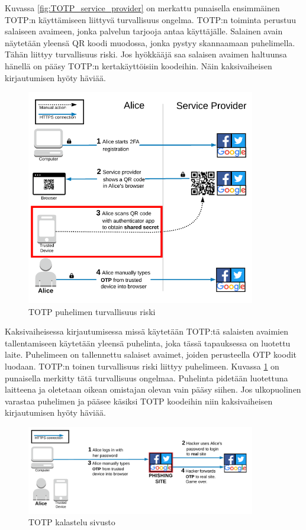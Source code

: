 Kuvassa \ref{fig:TOTP_service_provider} on merkattu punaisella ensimmäinen TOTP:n käyttämiseen liittyvä turvallisuus ongelma. TOTP:n toiminta perustuu salaiseen avaimeen, jonka palvelun tarjooja antaa käyttäjälle. Salainen avain näytetään yleensä QR koodi muodossa, jonka pystyy skannaamaan puhelimella. Tähän liittyy turvallisuus riski. Jos hyökkääjä saa salaisen avaimen haltuunsa hänellä on pääsy TOTP:n kertakäyttöisiin koodeihin. Näin kaksivaiheisen kirjautumisen hyöty häviää. 

\begin{figure}
    \centering
    \includegraphics[width=10cm]{template/figures/TOTP trusted-device-compromise.png}
    \caption{TOTP puhelimen turvallisuus riski \citep{TOTP}}
    \label{fig:TOTP_device}
\end{figure}

Kaksivaiheisessa kirjautumisessa missä käytetään TOTP:tä salaisten avaimien tallentamiseen käytetään yleensä puhelinta, joka tässä tapauksessa on luotettu laite. Puhelimeen on tallennettu salaiset avaimet, joiden perusteella OTP koodit luodaan. TOTP:n toinen turvallisuus riski liittyy puhelimeen. Kuvassa \ref{fig:TOTP_device} on punaisella merkitty tätä turvallisuus ongelmaa. Puhelinta pidetään luotettuna laitteena ja oletetaan oikean omistajan olevan vain pääsy siihen. Jos ulkopuolinen varastaa puhelimen ja pääsee käsiksi TOTP koodeihin niin kaksivaiheisen kirjautumisen hyöty häviää.

\begin{figure}[ht]
    \centering
    \includegraphics[width=10cm]{template/figures/totp phishing attack.png}
    \caption{TOTP kalastelu sivusto \citep{TOTP}}
    \label{fig:TOTP_phishing}
\end{figure}

